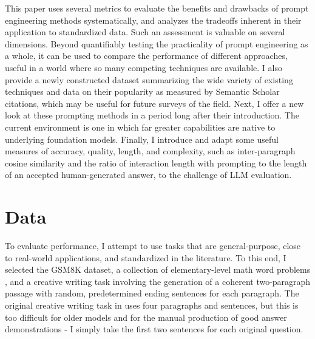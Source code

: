 \documentclass[11pt]{article}
\begin{document}
This paper uses several metrics to evaluate the benefits and drawbacks of prompt engineering methods systematically, and analyzes the tradeoffs inherent in their application to standardized data. Such an assessment is valuable on several dimensions. Beyond quantifiably testing the practicality of prompt engineering as a whole, it can be used to compare the performance of different approaches, useful in a world where so many competing techniques are available. I also provide a newly constructed dataset summarizing the wide variety of existing techniques and data on their popularity as measured by Semantic Scholar citations, which may be useful for future surveys of the field. Next, I offer a new look at these prompting methods in a period long after their introduction. The current environment is one in which far greater capabilities are native to underlying foundation models. Finally, I introduce and adapt some useful measures of accuracy, quality, length, and complexity, such as inter-paragraph cosine similarity and the ratio of interaction length with prompting to the length of an accepted human-generated answer, to the challenge of LLM evaluation.

\section*{Data}

To evaluate performance, I attempt to use tasks that are general-purpose, close to real-world applications, and standardized in the literature. To this end, I selected the GSM8K dataset, a collection of elementary-level math word problems \cite{cobbe_training_2021}, and a creative writing task involving the generation of a coherent two-paragraph passage with random, predetermined ending sentences for each paragraph. The original creative writing task in \citealp{yao_tree_2023} uses four paragraphs and sentences, but this is too difficult for older models and for the manual production of good answer demonstrations - I simply take the first two sentences for each original question. 
\end{document}
